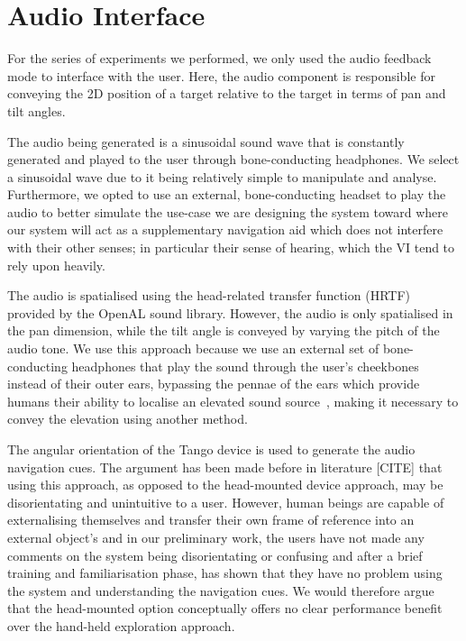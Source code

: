 \documentclass[format=sigconf, review=true, screen=true, anonymous=true]{acmart}
\begin{document}
\section{Audio Interface}

For the series of experiments we performed, we only used the audio feedback mode to interface with the user. Here, the audio component is responsible for conveying the 2D position of a target relative to the target in terms of pan and tilt angles. 

The audio being generated is a sinusoidal sound wave that is constantly generated and played to the user through bone-conducting headphones. We select a sinusoidal wave due to it being relatively simple to manipulate and analyse. Furthermore, we opted to use an external, bone-conducting headset to play the audio to better simulate the use-case we are designing the system toward where our system will act as a supplementary navigation aid which does not interfere with their other senses; in particular their sense of hearing, which the VI tend to rely upon heavily. 

The audio is spatialised using the head-related transfer function (HRTF) provided by the OpenAL sound library. However, the audio is only spatialised in the pan dimension, while the tilt angle is conveyed by varying the pitch of the audio tone. We use this approach because we use an external set of bone-conducting headphones that play the sound through the user's cheekbones instead of their outer ears, bypassing the pennae of the ears which provide humans their ability to localise an elevated sound source~\cite{roffler1968factors, algazi2001elevation}, making it necessary to convey the elevation using another method. 

The angular orientation of the Tango device is used to generate the audio navigation cues. The argument has been made before in literature [CITE] that using this approach, as opposed to the head-mounted device approach, may be disorientating and unintuitive to a user. However, human beings are capable of externalising themselves and transfer their own frame of reference into an external object's and in our preliminary work, the users have not made any comments on the system being disorientating or confusing and after a brief training and familiarisation phase, has shown that they have no problem using the system and understanding the navigation cues. We would therefore argue that the head-mounted option conceptually offers no clear performance benefit over the hand-held exploration approach. 
\end{document}

